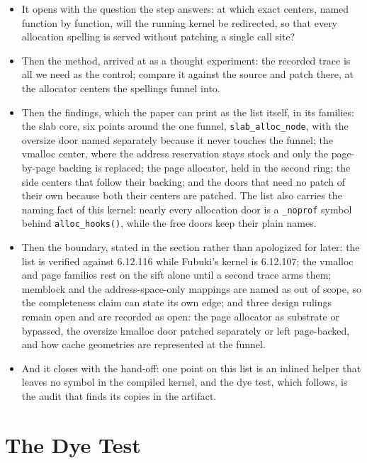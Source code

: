 \documentclass[11pt]{article}
\begin{document}
\begin{itemize}
\item It opens with the question the step answers: at which exact centers, named function by function, will the running kernel be redirected, so that every allocation spelling is served without patching a single call site?
\item Then the method, arrived at as a thought experiment: the recorded trace is all we need as the control; compare it against the source and patch there, at the allocator centers the spellings funnel into.
\item Then the findings, which the paper can print as the list itself, in its families: the slab core, six points around the one funnel, \texttt{slab\_alloc\_node}, with the oversize door named separately because it never touches the funnel; the vmalloc center, where the address reservation stays stock and only the page-by-page backing is replaced; the page allocator, held in the second ring; the side centers that follow their backing; and the doors that need no patch of their own because both their centers are patched. The list also carries the naming fact of this kernel: nearly every allocation door is a \texttt{\_noprof} symbol behind \texttt{alloc\_hooks()}, while the free doors keep their plain names.
\item Then the boundary, stated in the section rather than apologized for later: the list is verified against 6.12.116 while Fubuki's kernel is 6.12.107; the vmalloc and page families rest on the sift alone until a second trace arms them; memblock and the address-space-only mappings are named as out of scope, so the completeness claim can state its own edge; and three design rulings remain open and are recorded as open: the page allocator as substrate or bypassed, the oversize kmalloc door patched separately or left page-backed, and how cache geometries are represented at the funnel.
\item And it closes with the hand-off: one point on this list is an inlined helper that leaves no symbol in the compiled kernel, and the dye test, which follows, is the audit that finds its copies in the artifact.
\end{itemize}

\section{The Dye Test}
\end{document}
